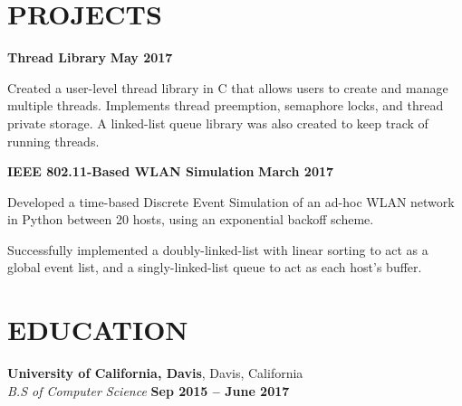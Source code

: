 \documentclass[margin,line,11pt]{resume}
\begin{document}
\begin{resume}
    \section{\mysidestyle \textbf{\large{P}\small{ROJECTS}}}
    \textbf{\listing Thread Library} \hfill \textbf{May 2017}\\
    \begin{list2}
        \item Created a user-level thread library in C that allows users to create and manage multiple threads. Implements thread preemption, semaphore locks, and thread private storage. A linked-list queue library was also created to keep track of running threads.
    \end{list2}

    \textbf{\listing IEEE 802.11-Based WLAN Simulation} \hfill \textbf{March 2017}\\
    \begin{list2}
        \item Developed a time-based Discrete Event Simulation of an ad-hoc WLAN network in Python between 20 hosts, using an exponential backoff scheme.
        \item Successfully implemented a doubly-linked-list with linear sorting to act as a global event list, and a singly-linked-list queue to act as each host's buffer.
    \end{list2}

\sectionline

    \section{\mysidestyle \textbf{\large{E}\small{DUCATION}}}

    \textbf{\listing University of California, Davis}, Davis, California \vspace{2mm}\\\vspace{1mm}%
    \textsl{B.S of Computer Science} \hfill \textbf{ Sep 2015 -- June 2017}\vspace{-3mm}\\\vspace{-1mm}%


\end{resume}
\end{document}
